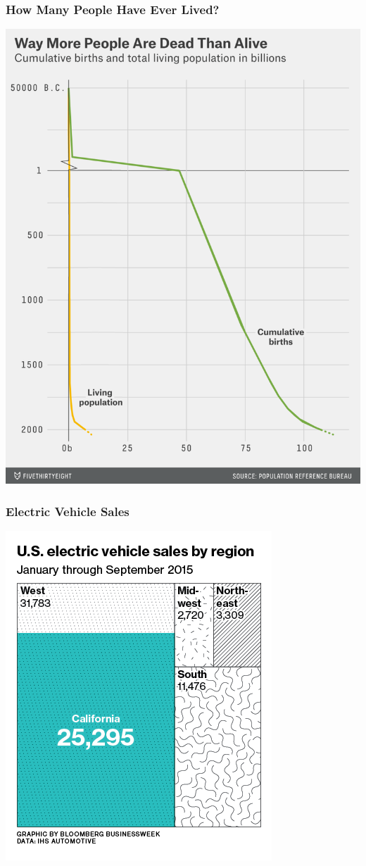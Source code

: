 \documentclass{beamer} %
\begin{document}
\begin{frame}\frametitle{How Many People Have Ever Lived?}
	\centering
	\includegraphics[width=0.62\linewidth]{538-people.png}
\end{frame}


\begin{frame}\frametitle{Electric Vehicle Sales}
	\centering
	\includegraphics[width=0.66\linewidth]{electric.png}
\end{frame}
\end{document}
